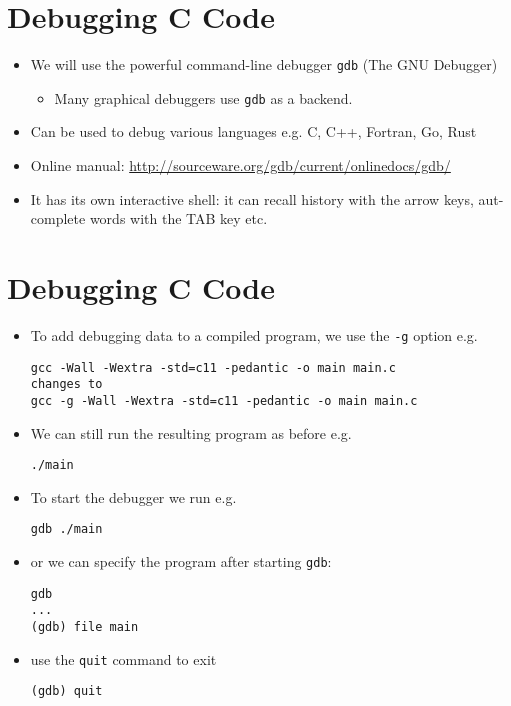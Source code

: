 \documentclass{article}
\begin{document}
\section{Debugging C Code}
\begin{itemize}
\item We will use the powerful command-line debugger \verb!gdb! (The GNU Debugger)
\begin{itemize}
\item Many graphical debuggers use \verb!gdb! as a backend.
\end{itemize}
\item Can be used to debug various languages e.g. C, C++, Fortran, Go, Rust
\item Online manual: \url{http://sourceware.org/gdb/current/onlinedocs/gdb/}
\item It has its own interactive shell: it can recall history with the arrow keys, aut-complete words with the TAB key etc.
\end{itemize}



\section{Debugging C Code}
\begin{itemize}
\item To add debugging data to a compiled program, we use the \verb!-g! option e.g.
\begin{verbatim}
gcc -Wall -Wextra -std=c11 -pedantic -o main main.c
changes to
gcc -g -Wall -Wextra -std=c11 -pedantic -o main main.c
\end{verbatim}
\item We can still run the resulting program as before e.g.
\begin{verbatim}
./main
\end{verbatim}
\item To start the debugger we run e.g.
\begin{verbatim}
gdb ./main
\end{verbatim}
\item or we can specify the program after starting \verb!gdb!:
\begin{verbatim}
gdb
...
(gdb) file main
\end{verbatim}
\item use the \verb!quit! command to exit
\begin{verbatim}
(gdb) quit
\end{verbatim}
\end{itemize}
\end{document}
